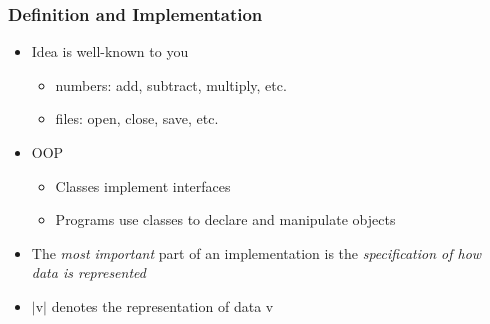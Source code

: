 \documentclass{beamer}
\begin{document}
\begin{frame}[fragile]
\frametitle{Definition and Implementation}
\begin{scriptsize}
\begin{itemize}
\item<1-> Idea is well-known to you
\begin{itemize}
  \item numbers: add, subtract, multiply, etc.
  \item files: open, close, save, etc.
\end{itemize}

\item<2-> OOP
\begin{itemize}
  \item Classes implement interfaces
  \item Programs use classes to declare and manipulate objects
\end{itemize}

\item<3-> The \emph{most important} part of an implementation is the \emph{specification of how data is represented}

\item<3-> $|$v$|$ denotes the representation of data v

\end{itemize}
\end{scriptsize}
\end{frame}
\end{document}
